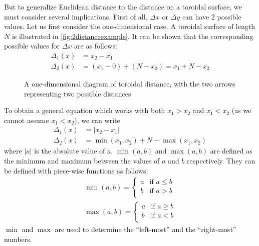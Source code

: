 But to generalize Euclidean distance to the distance on a toroidal surface, we must consider several implications. First of all, $\Delta x$ or $\Delta y$ can have 2 possible values. Let us first consider the one-dimensional case. A toroidal surface of length $N$ is illustrated in \autoref{fig:2distanceexample}. It can be shown that the corresponding possible values for $\Delta x$ are as follows:
\begin{align*}
    \Delta_1(x)&=x_2-x_1 \\
    \Delta_2(x)&=(x_1-0)+(N-x_2)=x_1+N-x_2
\end{align*}

\begin{figure}[tpb]
    \centering
    \caption{A one-dimensional diagram of toroidal distance, with the two arrows representing two possible distances}%
    \label{fig:2distanceexample}
\end{figure}


To obtain a general equation which works with both $x_1>x_2$ and $x_1<x_2$ (as we cannot assume $x_1<x_2$), we can write
\begin{align*}
    \Delta_1(x)&=\lvert x_2-x_1 \rvert \\
    \Delta_2(x)&=\min{(x_1,x_2)}+N-\max{(x_1,x_2)}
\end{align*}
where $\lvert a\rvert$ is the absolute value of $a$, $\min{(a,b)}$ and $\max{(a,b)}$ are defined as the minimum and maximum between the values of $a$ and $b$ respectively. They can be defined with piece-wise functions as follows:
\begin{align*}
        \min{(a,b)}=
        \begin{cases}
            a&\text{if $a\leq b$}\\
            b&\text{if $a>b$}\\
        \end{cases}\\
        \max{(a,b)}=
        \begin{cases}
            a&\text{if $a\geq b$}\\
            b&\text{if $a<b$}\\
        \end{cases}
\end{align*}
$\min$ and $\max$ are used to determine the  ``left-most'' and the ``right-most'' numbers.

